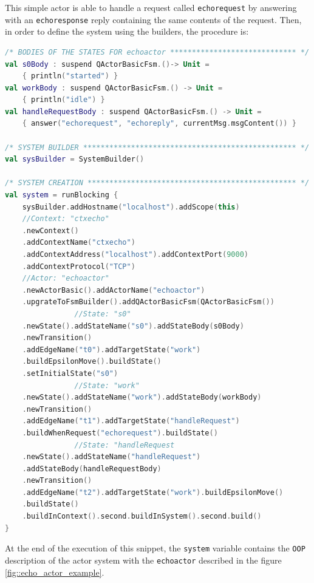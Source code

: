 This simple actor is able to handle a request called \texttt{echorequest} by answering with an \texttt{echoresponse} reply containing the same contents of the request.
Then, in order to define the system using the builders, the procedure is:


\begin{lstlisting}[caption={Example of builders use},label={lst::echoexample},language=kotlin]
/* BODIES OF THE STATES FOR echoactor ***************************** */
val s0Body : suspend QActorBasicFsm.()-> Unit =
	{ println("started") }
val workBody : suspend QActorBasicFsm.() -> Unit =
	{ println("idle") }
val handleRequestBody : suspend QActorBasicFsm.() -> Unit =
	{ answer("echorequest", "echoreply", currentMsg.msgContent()) }

/* SYSTEM BUILDER ************************************************* */
val sysBuilder = SystemBuilder()

/* SYSTEM CREATION ************************************************ */
val system = runBlocking {
	sysBuilder.addHostname("localhost").addScope(this)
	//Context: "ctxecho"
	.newContext()
	.addContextName("ctxecho")
	.addContextAddress("localhost").addContextPort(9000)
	.addContextProtocol("TCP")
	//Actor: "echoactor"
	.newActorBasic().addActorName("echoactor")
	.upgrateToFsmBuilder().addQActorBasicFsm(QActorBasicFsm())
				//State: "s0"
	.newState().addStateName("s0").addStateBody(s0Body)
	.newTransition()
	.addEdgeName("t0").addTargetState("work")
	.buildEpsilonMove().buildState()
	.setInitialState("s0")
				//State: "work"
	.newState().addStateName("work").addStateBody(workBody)
	.newTransition()
	.addEdgeName("t1").addTargetState("handleRequest")
	.buildWhenRequest("echorequest").buildState()
				//State: "handleRequest
	.newState().addStateName("handleRequest")
	.addStateBody(handleRequestBody)
	.newTransition()
	.addEdgeName("t2").addTargetState("work").buildEpsilonMove()
	.buildState()
	.buildInContext().second.buildInSystem().second.build()
}
\end{lstlisting}

At the end of the execution of this snippet, the \verb*|system| variable contains the \texttt{OOP} description of the actor system with the \texttt{echoactor} described in the figure \ref{fig::echo_actor_example}.